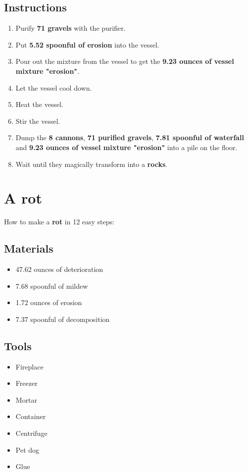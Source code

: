 \documentclass{article}
\begin{document}
\subsection{Instructions}\begin{enumerate}
\item 
Purify \textbf{71 gravels} with the purifier.
\item 
Put \textbf{5.52 spoonful of erosion} into the vessel.
\item 
Pour out the mixture from the vessel to get the \textbf{9.23 ounces of vessel mixture "erosion"}.
\item 
Let the vessel cool down.
\item 
Heat the vessel.
\item 
Stir the vessel.
\item 
Dump the \textbf{8 cannons}, \textbf{71 purified gravels}, \textbf{7.81 spoonful of waterfall} and \textbf{9.23 ounces of vessel mixture "erosion"} into a pile on the floor.
\item 
Wait until they magically transform into a \textbf{rocks}.
\end{enumerate}
\newpage
\section{A rot}How to make a \textbf{rot} in 12 easy steps:

\subsection{Materials}\begin{itemize}
\item 
47.62 ounces of deterioration
\item 
7.68 spoonful of mildew
\item 
1.72 ounces of erosion
\item 
7.37 spoonful of decomposition
\end{itemize}
\subsection{Tools}\begin{itemize}
\item 
Fireplace
\item 
Freezer
\item 
Mortar
\item 
Container
\item 
Centrifuge
\item 
Pet dog
\item 
Glue
\end{itemize}
\end{document}
